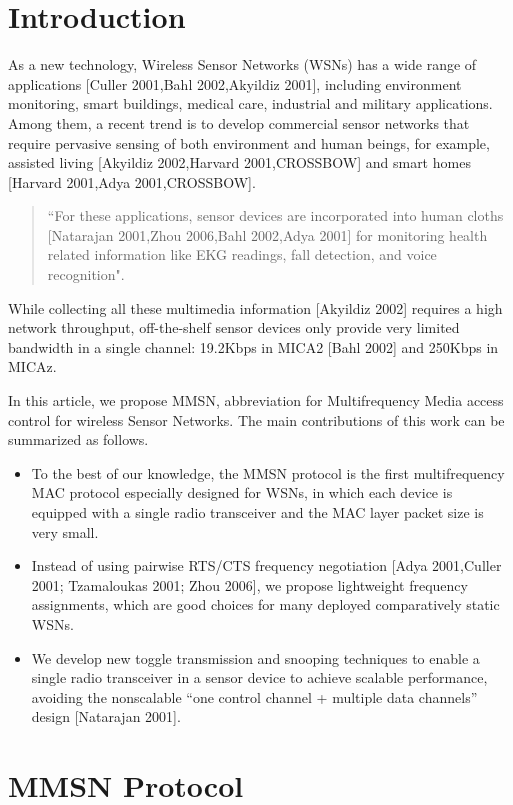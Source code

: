 \section{Introduction}

As a new technology, Wireless Sensor Networks (WSNs) has a wide
range of applications [Culler 2001,Bahl 2002,Akyildiz 2001], including
environment monitoring, smart buildings, medical care, industrial and
military applications. Among them, a recent trend is to develop
commercial sensor networks that require pervasive sensing of both
environment and human beings, for example, assisted living
[Akyildiz 2002,Harvard 2001,CROSSBOW] and smart homes
[Harvard 2001,Adya 2001,CROSSBOW].
\begin{quote}
``For these applications, sensor devices are incorporated into human
cloths [Natarajan 2001,Zhou 2006,Bahl 2002,Adya 2001] for monitoring
health related information like EKG readings, fall detection, and voice recognition".
\end{quote}
While collecting all these multimedia information
[Akyildiz 2002] requires a high network throughput, off-the-shelf
sensor devices only provide very limited bandwidth in a single
channel: 19.2Kbps in MICA2 [Bahl 2002] and 250Kbps in MICAz.

In this article, we propose MMSN, abbreviation for Multifrequency
Media access control for wireless Sensor Networks. The main
contributions of this work can be summarized as follows.
\begin{itemize}
\item To the best of our knowledge, the MMSN protocol is the first
multifrequency MAC protocol especially designed for WSNs, in which
each device is equipped with a single radio transceiver and
the MAC layer packet size is very small.
\item Instead of using pairwise RTS/CTS frequency negotiation
[Adya 2001,Culler 2001; Tzamaloukas 2001; Zhou 2006],
we propose lightweight frequency assignments, which are good choices
for many deployed comparatively static WSNs.
\item We develop new toggle transmission and snooping techniques to
enable a single radio transceiver in a sensor device to achieve
scalable performance, avoiding the nonscalable ``one
control channel + multiple data channels'' design [Natarajan 2001].
\end{itemize}

\section{MMSN Protocol}


